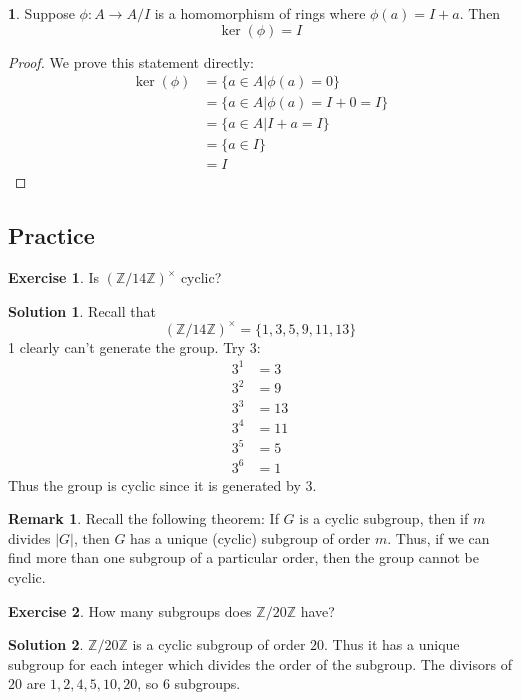 \documentclass[12pt]{article}
\theoremstyle{definition}
\newtheorem{theorem}{\color{ForestGreen}{\textbf{Theorem}}}
\newcommand{\Z}{\mathbb{Z}}
\newtheorem{exercise}{\color{YellowOrange}Exercise}
\newtheorem{remark}{Remark}
\theoremstyle{definition}
\newtheorem{solution}{\color{Goldenrod}Solution}
\begin{document}
\begin{theorem}
	Suppose $\phi : A \to A/I$ is a homomorphism of rings where $\phi(a) = I + a$. Then 
	\begin{equation}
		\ker(\phi) = I
	\end{equation}
\end{theorem}
\begin{proof}
	We prove this statement directly:
	\begin{align*}
		\ker(\phi) &= \{ a \in A | \phi(a) = 0\} \\ 
		&= \{ a \in A | \phi(a) = I + 0 = I\} \tag{$I$ is the trivial element of the quotient}\\
		&= \{ a \in A | I + a = I \} \\
		&= \{ a \in I \} \\
		&= I
	\end{align*}
\end{proof}

\subsection{Practice}
\begin{exercise}
	Is $(\Z / 14 \Z)^{\times}$ cyclic? 
\end{exercise}
\begin{solution}
	Recall that
	\begin{equation}
		(\Z / 14 \Z)^{\times} = \{1,3,5,9,11,13\}
	\end{equation}
	1 clearly can't generate the group. Try 3:
	\begin{align*}
		3^1 &= 3 \\
		3^2 &= 9 \\
		3^3 &= 13 \\
		3^4 &= 11 \\
		3^5 &= 5 \\
		3^6 &= 1
	\end{align*}
	Thus the group is cyclic since it is generated by 3.
\end{solution}
\begin{remark}
	Recall the following theorem: If $G$ is a cyclic subgroup, then if $m$ divides $|G|$, then $G$ has a unique (cyclic) subgroup of order $m$. Thus, if we can find more than one subgroup of a particular order, then the group cannot be cyclic. 
\end{remark}

\begin{exercise}
	How many subgroups does $\Z / 20 \Z$ have?
\end{exercise}
\begin{solution}
	 $\Z / 20 \Z$ is a cyclic subgroup of order $20$. Thus it has a unique subgroup for each integer which divides the order of the subgroup. The divisors of $20$ are $1,2,4,5,10,20$, so $6$ subgroups. 
\end{solution}
\end{document}
